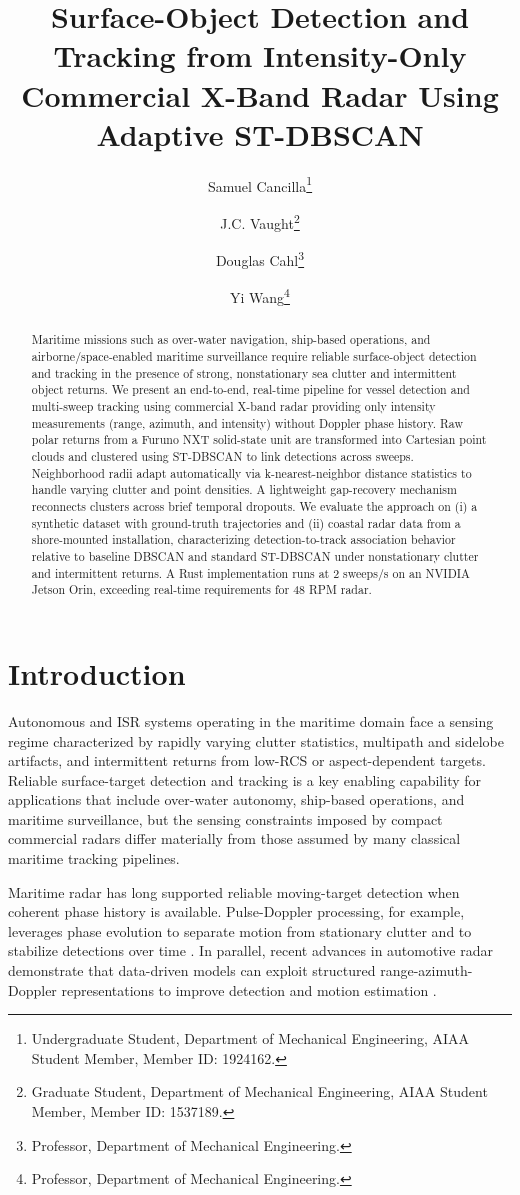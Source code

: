 \documentclass[conf]{new-aiaa}
\title{Surface-Object Detection and Tracking from Intensity-Only Commercial X-Band Radar Using Adaptive ST-DBSCAN}
\author{Samuel Cancilla\footnote{Undergraduate Student, Department of Mechanical Engineering, AIAA Student Member, Member ID: 1924162.}}
\author{J.C. Vaught\footnote{Graduate Student, Department of Mechanical Engineering, AIAA Student Member, Member ID: 1537189.}}
\author{Douglas Cahl\footnote{Professor, Department of Mechanical Engineering.}}
\author{Yi Wang\footnote{Professor, Department of Mechanical Engineering.}}
\affil{University of South Carolina, Columbia, SC, 29208}
\begin{document}
\maketitle

\begin{abstract}
\noindent Maritime missions such as over-water navigation, ship-based operations, and airborne/space-enabled maritime surveillance require reliable surface-object detection and tracking in the presence of strong, nonstationary sea clutter and intermittent object returns. We present an end-to-end, real-time pipeline for vessel detection and multi-sweep tracking using commercial X-band radar providing only intensity measurements (range, azimuth, and intensity) without Doppler phase history. Raw polar returns from a Furuno NXT solid-state unit are transformed into Cartesian point clouds and clustered using ST-DBSCAN to link detections across sweeps. Neighborhood radii adapt automatically via k-nearest-neighbor distance statistics to handle varying clutter and point densities. A lightweight gap-recovery mechanism reconnects clusters across brief temporal dropouts. We evaluate the approach on (i) a synthetic dataset with ground-truth trajectories and (ii) coastal radar data from a shore-mounted installation, characterizing detection-to-track association behavior relative to baseline DBSCAN and standard ST-DBSCAN under nonstationary clutter and intermittent returns. A Rust implementation runs at 2 sweeps/s on an NVIDIA Jetson Orin, exceeding real-time requirements for 48 RPM radar.
\end{abstract}

\section{Introduction}
Autonomous and ISR systems operating in the maritime domain face a sensing regime characterized by rapidly varying clutter statistics, multipath and sidelobe artifacts, and intermittent returns from low-RCS or aspect-dependent targets. Reliable surface-target detection and tracking is a key enabling capability for applications that include over-water autonomy, ship-based operations, and maritime surveillance, but the sensing constraints imposed by compact commercial radars differ materially from those assumed by many classical maritime tracking pipelines.

Maritime radar has long supported reliable moving-target detection when coherent phase history is available. Pulse-Doppler processing, for example, leverages phase evolution to separate motion from stationary clutter and to stabilize detections over time \cite{delaney2000lincoln}. In parallel, recent advances in automotive radar demonstrate that data-driven models can exploit structured range-azimuth-Doppler representations to improve detection and motion estimation \cite{major2019rad}.
\end{document}
